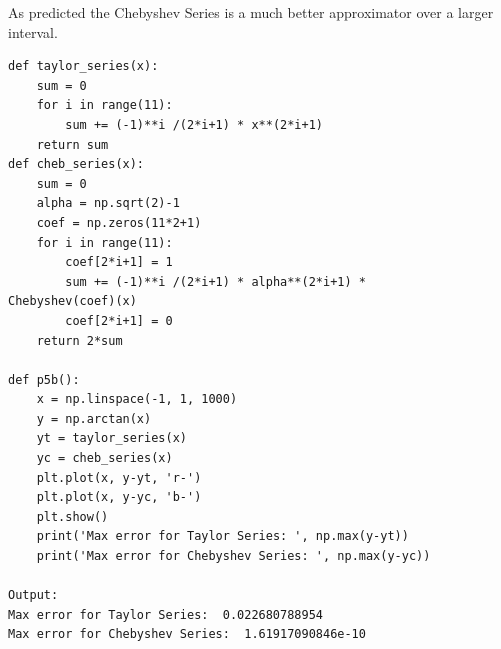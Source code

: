 \documentclass[12pt]{article}
\begin{document}
	As predicted the Chebyshev Series is a much better approximator over a larger interval.
	
	\begin{lstlisting}
def taylor_series(x):
	sum = 0
	for i in range(11):
		sum += (-1)**i /(2*i+1) * x**(2*i+1)
	return sum
def cheb_series(x):
	sum = 0
	alpha = np.sqrt(2)-1
	coef = np.zeros(11*2+1)
	for i in range(11):
		coef[2*i+1] = 1
		sum += (-1)**i /(2*i+1) * alpha**(2*i+1) * 
Chebyshev(coef)(x)
		coef[2*i+1] = 0
	return 2*sum

def p5b():
	x = np.linspace(-1, 1, 1000)
	y = np.arctan(x)
	yt = taylor_series(x)
	yc = cheb_series(x)
	plt.plot(x, y-yt, 'r-')
	plt.plot(x, y-yc, 'b-')
	plt.show()
	print('Max error for Taylor Series: ', np.max(y-yt))
	print('Max error for Chebyshev Series: ', np.max(y-yc))
	
Output: 
Max error for Taylor Series:  0.022680788954
Max error for Chebyshev Series:  1.61917090846e-10
	\end{lstlisting}


		
\end{document}
